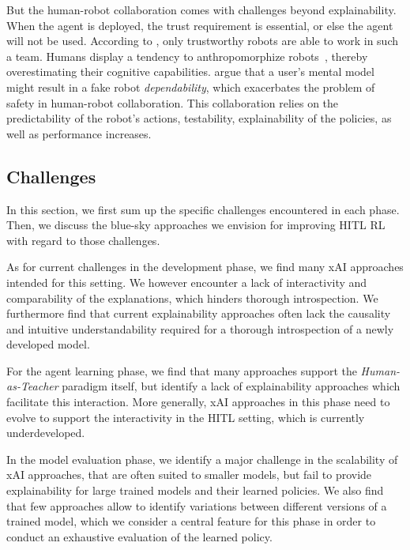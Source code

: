 \documentclass[twoside,11pt]{article}
\begin{document}
\begin{enumerate}
But the human-robot collaboration comes with challenges beyond explainability. When the agent is deployed, the trust requirement is essential, or else the agent will not be used. According to \citet{DeSaintsEtAl:2008:phri}, only trustworthy robots are able to work in such a team. Humans display a tendency to anthropomorphize robots~\citep{damiano2018anthropomorphism}, thereby overestimating their cognitive capabilities. \citet{DeSaintsEtAl:2008:phri} argue that a user's mental model might result in a fake robot \emph{dependability}, which exacerbates the problem of safety in human-robot collaboration. This collaboration relies on the predictability of the robot's actions, testability, explainability of the policies, as well as performance increases.


\subsection{Challenges}
\label{sec:ThirdGeneration}

In this section, we first sum up the specific challenges encountered in each phase. Then, we discuss the blue-sky approaches we envision for improving HITL RL with regard to those challenges.

As for current challenges in the development phase, we find many xAI approaches intended for this setting. We however encounter a lack of interactivity and comparability of the explanations, which hinders thorough introspection. We furthermore find that current explainability approaches often lack the causality and intuitive understandability required for a thorough introspection of a newly developed model.

For the agent learning phase, we find that many approaches support the \emph{Human-as-Teacher} paradigm itself, but identify a lack of explainability approaches which facilitate this interaction. More generally, xAI approaches in this phase need to evolve to support the interactivity in the HITL setting, which is currently underdeveloped.

In the model evaluation phase, we identify a major challenge in the scalability of xAI approaches, that are often suited to smaller models, but fail to provide explainability for large trained models and their learned policies. We also find that few approaches allow to identify variations between different versions of a trained model, which we consider a central feature for this phase in order to conduct an exhaustive evaluation of the learned policy.


\end{enumerate}
\end{document}
